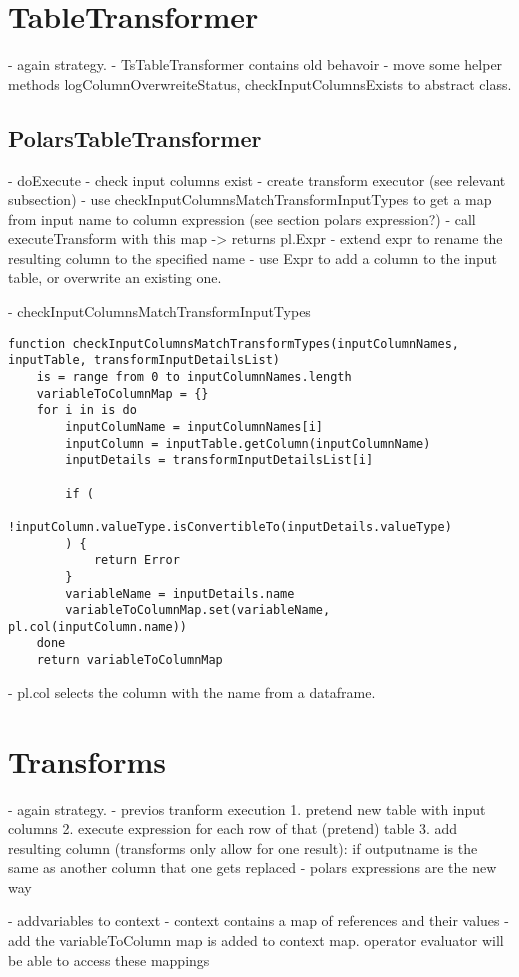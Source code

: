 \section{TableTransformer}
- again strategy.
- TsTableTransformer contains old behavoir
- move some helper methods logColumnOverwreiteStatus, checkInputColumnsExists to abstract class.

\subsection{PolarsTableTransformer}
- doExecute
- check input columns exist
- create transform executor (see relevant subsection)
- use checkInputColumnsMatchTransformInputTypes to get a map from input name to column expression (see section polars expression?)
- call executeTransform with this map -> returns pl.Expr
- extend expr to rename the resulting column to the specified name
- use Expr to add a column to the input table, or overwrite an existing one.


- checkInputColumnsMatchTransformInputTypes
\begin{listing}
	\begin{verbatim}
function checkInputColumnsMatchTransformTypes(inputColumnNames, inputTable, transformInputDetailsList)
	is = range from 0 to inputColumnNames.length
	variableToColumnMap = {}
	for i in is do
		inputColumName = inputColumnNames[i]
		inputColumn = inputTable.getColumn(inputColumnName)
		inputDetails = transformInputDetailsList[i]

		if (
			!inputColumn.valueType.isConvertibleTo(inputDetails.valueType)
		) {
			return Error
		}
		variableName = inputDetails.name
		variableToColumnMap.set(variableName, pl.col(inputColumn.name))
	done
	return variableToColumnMap
	\end{verbatim}
\end{listing}
- pl.col selects the column with the name from a dataframe.


\section{Transforms}
- again strategy.
- previos tranform execution
1. pretend new table with input columns
2. execute expression for each row of that (pretend) table
3. add resulting column (transforms only allow for one result): if outputname is the same as another column that one gets replaced
- polars expressions are the new way

- addvariables to context
- context contains a map of references and their values
- add the variableToColumn map is added to context map. operator evaluator will be able to access these mappings

